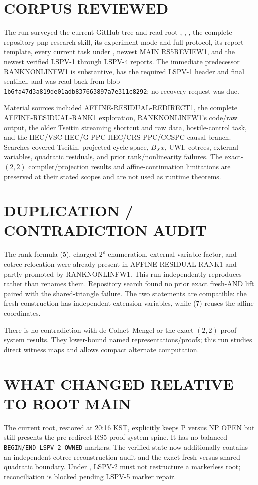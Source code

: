 \documentclass[11pt]{article}
\begin{document}
\section{CORPUS REVIEWED}
The run surveyed the current GitHub tree and read root ,
, , the complete repository pnp-research skill,
its experiment mode and full protocol, its report template, every current
task under , newest MAIN RS5REVIEW1, and the newest verified
LSPV-1 through LSPV-4 reports.  The immediate predecessor
RANKNONLINFW1 is substantive, has the required LSPV-1 header and final
sentinel, and was read back from blob
\texttt{1b6fa47d3a819de01adb837663897a7e311c8292}; no recovery request was due.

Material sources included AFFINE-RESIDUAL-REDIRECT1, the complete
AFFINE-RESIDUAL-RANK1 exploration, RANKNONLINFW1's code/raw output, the older
Tseitin streaming shortcut and raw data, hostile-control task, and the
HEC/VSC-HEC/G-PPC-HEC/CRS-PPC/CCSPC causal branch.  Searches covered Tseitin,
projected cycle space, $B_Xx$, UWI, cotrees, external variables, quadratic
residuals, and prior rank/nonlinearity failures.  The exact-$(2,2)$
compiler/projection results and affine-continuation limitations are preserved
at their stated scopes and are not used as runtime theorems.

\section{DUPLICATION / CONTRADICTION AUDIT}
The rank formula (5), charged $2^\rho$ enumeration, external-variable factor,
and cotree relocation were already present in AFFINE-RESIDUAL-RANK1 and partly
promoted by RANKNONLINFW1.  This run independently reproduces rather than
renames them.  Repository search found no prior exact fresh-AND lift paired
with the shared-triangle failure.  The two statements are compatible: the
fresh construction has independent extension variables, while (7) reuses
the affine coordinates.

There is no contradiction with de Colnet--Mengel or the exact-$(2,2)$
proof-system results.  They lower-bound named representations/proofs; this
run studies direct witness maps and allows compact alternate computation.

\section{WHAT CHANGED RELATIVE TO ROOT MAIN}
The current root, restored at 20:16 KST, explicitly keeps P versus NP OPEN but
still presents the pre-redirect RS5 proof-system spine.  It has no balanced
\texttt{BEGIN/END LSPV-2 OWNED} markers.  The verified state now additionally
contains an independent cotree reconstruction audit and the exact
fresh-versus-shared quadratic boundary.  Under , LSPV-2 must
not restructure a markerless root; reconciliation is blocked pending LSPV-5
marker repair.
\end{document}
